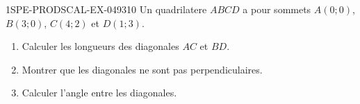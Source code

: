 \begin{exercice}{1SPE-PRODSCAL-EX-049}{3}{10}
Un quadrilatere $ABCD$ a pour sommets $A(0; 0)$, $B(3; 0)$, $C(4; 2)$ et $D(1; 3)$.
\begin{enumerate}
  \item Calculer les longueurs des diagonales $AC$ et $BD$.
  \item Montrer que les diagonales ne sont pas perpendiculaires.
  \item Calculer l'angle entre les diagonales.
\end{enumerate}
\end{exercice}
